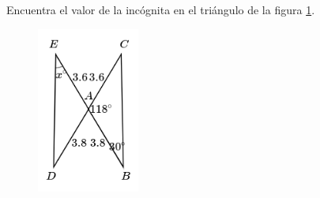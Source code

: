 \question[10]  Encuentra el valor de la incógnita en el triángulo de la figura \ref{fig:angle_triangle_27}.
\begin{figure}[H]
    \begin{center}
        \includegraphics[width=0.3\textwidth]{../images/angle_triangle_27.png}
    \end{center}
    \caption{}
    \label{fig:angle_triangle_27}
\end{figure}